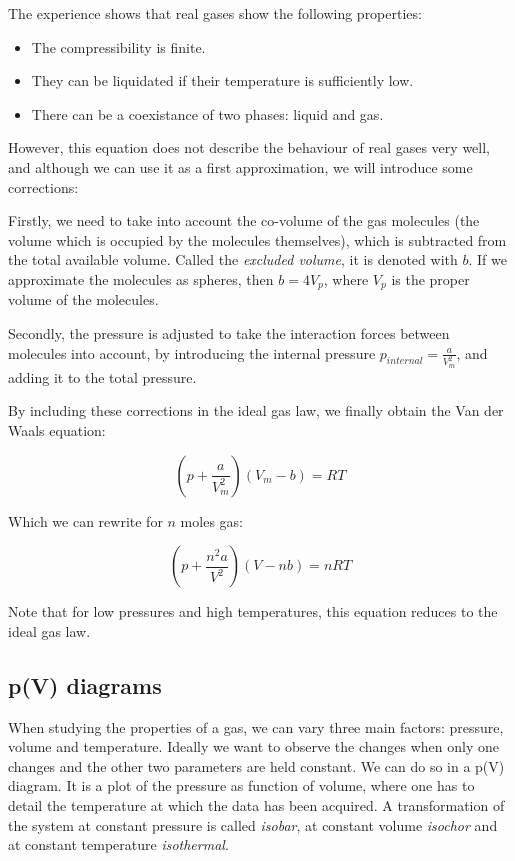\documentclass{scrartcl}
\begin{document}
The experience shows that real gases show the following properties:

\begin{itemize}
    \item The compressibility is finite.
    \item They can be liquidated if their temperature is sufficiently low.
    \item There can be a coexistance of two phases: liquid and gas.
\end{itemize}

However, this equation does not describe the behaviour of real gases very well, and although we can use it as a first approximation, we will introduce some corrections:

\medskip

Firstly, we need to take into account the co-volume of the gas molecules (the volume which is occupied by the molecules themselves), which is subtracted from the total available volume. Called the \textit{excluded volume}, it is denoted with $b$. If we approximate the molecules as spheres, then $b = 4 V_p$, where $V_p$ is the proper volume of the molecules.

\medskip

Secondly, the pressure is adjusted to take the interaction forces between molecules into account, by introducing the internal pressure $p_{internal} = \frac{a}{V_m^2}$, and adding it to the total pressure.

\medskip

By including these corrections in the ideal gas law, we finally obtain the Van der Waals equation:

\begin{equation}
    \boxed{(p + \frac{a}{V_m^2})(V_m-b)=RT}
\end{equation}

Which we can rewrite for $n$ moles gas:

\begin{equation}
    \boxed{(p + \frac{n^2a}{V^2})(V-nb)=nRT}
\end{equation}

Note that for low pressures and high temperatures, this equation reduces to the ideal gas law. 

\subsection{p(V) diagrams}

When studying the properties of a gas, we can vary three main factors: pressure, volume and temperature. Ideally we want to observe the changes when only one changes and the other two parameters are held constant. We can do so in a p(V) diagram. It is a plot of the pressure as function of volume, where one has to detail the temperature at which the data has been acquired.
A transformation of the system at constant pressure is called \textit{isobar}, at constant volume \textit{isochor} and at constant temperature \textit{isothermal}.
\end{document}
